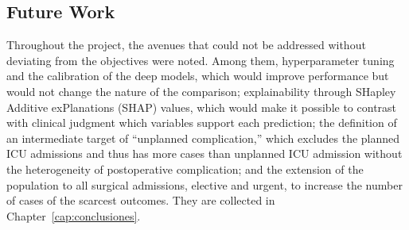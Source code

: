 \subsection{Future Work}

Throughout the project, the avenues that could not be addressed without deviating from the objectives were noted. Among them, hyperparameter tuning and the calibration of the deep models, which would improve performance but would not change the nature of the comparison; explainability through SHapley Additive exPlanations (SHAP) values, which would make it possible to contrast with clinical judgment which variables support each prediction; the definition of an intermediate target of ``unplanned complication,'' which excludes the planned ICU admissions and thus has more cases than unplanned ICU admission without the heterogeneity of postoperative complication; and the extension of the population to all surgical admissions, elective and urgent, to increase the number of cases of the scarcest outcomes. They are collected in Chapter~\ref{cap:conclusiones}.
